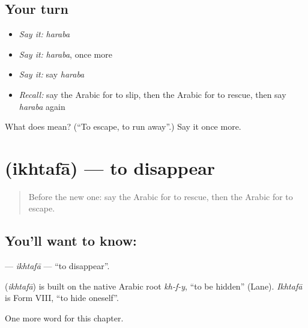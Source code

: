 \subsection*{Your turn}
\begin{itemize}
\raggedright
  \item \emph{Say it:} \emph{haraba}
  \item \emph{Say it:} \emph{haraba}, once more
  \item \emph{Say it:} say \emph{haraba}
  \item \emph{Recall:} say the Arabic for to slip, then the Arabic for to rescue, then say \emph{haraba} again
\end{itemize}

\begin{tcolorbox}[breakable,colback=teal!4,colframe=teal!35!black,title={Before you move on}]
What does  mean? (\textquotedblleft{}To escape, to run away\textquotedblright{}.) Say it once more.
\end{tcolorbox}
\section[\texorpdfstring{\ar{اختفى} (ikhtafā)}{اختفى (ikhtafā)}]{ (ikhtafā) — to disappear}

\label{lesson:AR-C167-ikhtafa}



\begin{quote}
Before the new one: say the Arabic for to rescue, then the Arabic for to escape.
\end{quote}

\subsection*{You'll want to know: }
\textbf{} — \emph{ikhtafā} — \textquotedblleft{}to disappear\textquotedblright{}.

\begin{cousinweb}
\textbf{} (\emph{ikhtafā}) is built on the native Arabic root \emph{kh-f-y}, \textquotedblleft{}to be hidden\textquotedblright{} (Lane). \emph{Ikhtafā} is Form VIII, \textquotedblleft{}to hide oneself\textquotedblright{}.
\end{cousinweb}

\begin{grammarlens}[title={What you've built}]
One more word for this chapter.
\end{grammarlens}

